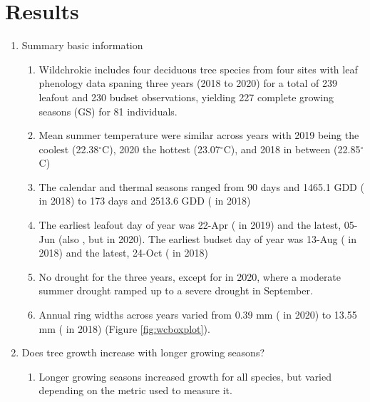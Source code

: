 \documentclass{article}\usepackage[]{graphicx}\usepackage[]{xcolor}
\begin{document}
\section*{Results}
\begin{enumerate}
\item Summary basic information
  \begin{enumerate}
  
  \item Wildchrokie includes four deciduous tree species from four sites with leaf phenology data spaning three years (2018 to 2020) for a total of 239 leafout and 
  230 budset observations, yielding 
  227 complete growing seasons (GS) for 
  81 individuals. 
    
  \item Mean summer temperature were similar across years with 2019 being the coolest (22.38$^\circ$C), 2020 the hottest (23.07$^\circ$C), and 2018 in between (22.85$^\circ$C)
    
  \item The calendar and thermal seasons ranged from 
  90 days and 
  1465.1 GDD ({\Ball} in 2018) to 
  173 days and 2513.6 GDD ({\Ainc} in 2018)

  \item The earliest leafout day of year was 
  22-Apr ({\Ainc} in
  2019) and the latest,
  05-Jun (also {\Ainc}, but in
  2020). 
  The earliest budset day of year was 
  13-Aug ({\Ball} in
  2018) and the latest, 
  24-Oct ({\Ainc} in
  2018) 
  
  \item No drought for the three years, except for in 2020, where a moderate summer drought ramped up to a severe drought in September.
  
  \item Annual ring widths across years varied from 
  0.39 mm ({\Ball} in 2020) to 
  13.55 mm ({\Bpop} in 2018) (Figure \ref{fig:wcboxplot}). 
 
\end{enumerate}

\item Does tree growth increase with longer growing seasons?
  \begin{enumerate}

  \item Longer growing seasons increased growth for all species, but varied depending on the metric used to measure it.


\end{enumerate}
\end{enumerate}
\end{document}
